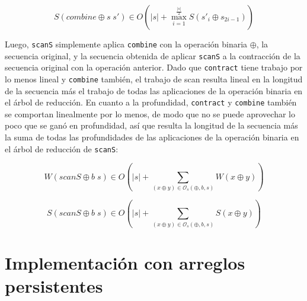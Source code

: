 \documentclass[a4paper,10pt]{article}
\begin{document}
\begin{equation*}
    S \left( combine \oplus s \; s' \right) \in
    O \left( \vert s \vert + \max_{i=1}^{\frac{\vert s \vert}{2}} S \left( s'_{i} \oplus s_{2i - 1} \right) \right)
\end{equation*}

Luego, \texttt{scanS} simplemente aplica \texttt{combine} con la operación binaria
$\oplus$, la secuencia original, y la secuencia obtenida de aplicar \texttt{scanS}
a la contracción de la secuencia original con la operación anterior. Dado que
\texttt{contract} tiene trabajo por lo menos lineal y \texttt{combine} también,
el trabajo de scan resulta lineal en la longitud de la secuencia más el trabajo
de todas las aplicaciones de la operación binaria en el árbol de reducción. En
cuanto a la profundidad, \texttt{contract} y \texttt{combine} también se comportan
linealmente por lo menos, de modo que no se puede aprovechar lo poco que se ganó
en profundidad, así que resulta la longitud de la secuencia más la suma de todas
las profundidades de las aplicaciones de la operación binaria en el árbol de
reducción de \texttt{scanS}:

\begin{equation*}
    W \left( scanS \oplus b \; s \right) \in
    O \left( \vert s \vert + \sum_{(x \oplus y) \in \mathcal{O}_s(\oplus,b,s)} W \left( x \oplus y \right) \right)
\end{equation*}

\begin{equation*}
    S \left( scanS \oplus b \; s \right) \in
    O \left( \vert s \vert + \sum_{(x \oplus y) \in \mathcal{O}_s(\oplus,b,s)} S \left( x \oplus y \right) \right)
\end{equation*}

\newpage{}
































\part*{Implementación con arreglos persistentes}
\end{document}
